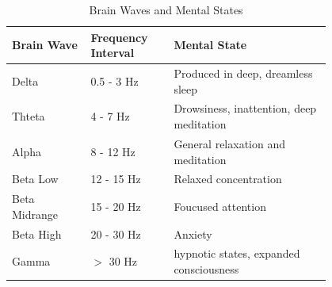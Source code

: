 \documentclass[9pt,twocolumn]{paper-template}
\begin{document}
\begin{table}[ht]
\caption{Brain Waves and Mental States \cite{Abhang2016}}
\label{table:BrainWaves}
\centering
\begin{tabular}{p{0.2\linewidth} p{0.2\linewidth} p{0.4\linewidth}}
Brain Wave & Frequency Interval & Mental State \\  [0.5ex]
\hline
Delta  & 0.5 - 3 Hz & Produced in deep, dreamless sleep\\
Thteta & 4 - 7 Hz  & Drowsiness, inattention, deep meditation\\
Alpha & 8 - 12 Hz  & General relaxation and meditation \\
Beta Low& 12 - 15 Hz  &   Relaxed concentration \\
Beta Midrange& 15 - 20 Hz  &   Foucused attention \\
Beta High& 20 - 30 Hz  &   Anxiety \\
Gamma& $>$ 30 Hz  &   hypnotic states, expanded consciousness \\
[1ex]
\hline
\end{tabular}
\end{table}
\end{document}
